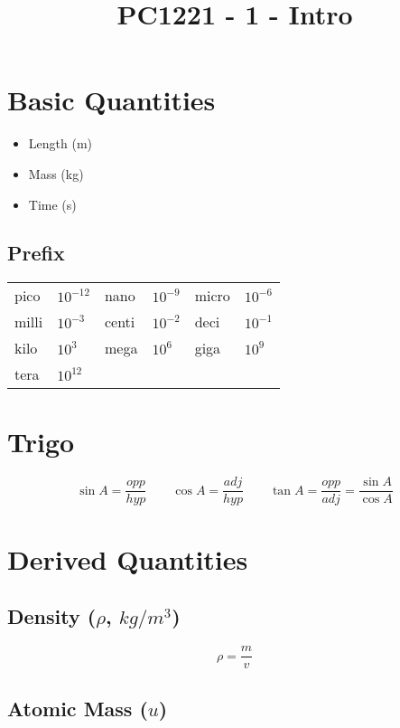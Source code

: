 \documentclass[12pt]{article}
\title{\textbf{PC1221 - 1 - Intro}}
\date{}
\begin{document}
\maketitle

\begin{spacing}{1.5}

\section{Basic Quantities}

\begin{itemize}
	\item Length (m)
	\item Mass (kg)
	\item Time (s)
\end{itemize}

\subsection{Prefix}

\begin{tabular}{ll | ll | ll}
pico & $10^{-12}$ & nano & $10^{-9}$ & micro & $10^{-6}$ \\
milli & $10^{-3}$ & centi & $10^{-2}$ & deci & $10^{-1}$ \\
kilo & $10^{3}$ & mega & $10^{6}$ & giga & $10^{9}$ \\
tera & $10^{12}$ \\
\end{tabular}

\section{Trigo}

$$\sin{A} = \frac{opp}{hyp} \qquad \cos{A} = \frac{adj}{hyp} \qquad \tan{A} = \frac{opp}{adj} = \frac{\sin{A}}{\cos{A}}$$

\section{Derived Quantities}

\subsection{Density ($\rho$, $kg/m^3$)}

$$\rho = \frac{m}{v}$$

\subsection{Atomic Mass ($u$)}


\end{spacing}
\end{document}

